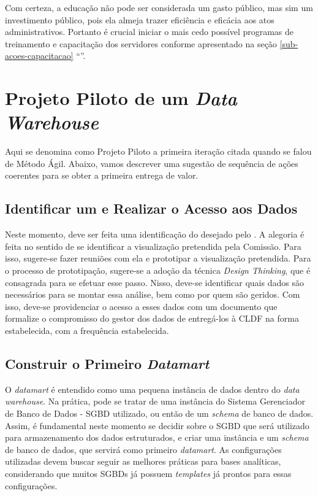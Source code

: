     Com certeza, a educação não pode ser considerada um gasto público, mas sim um investimento público, pois ela almeja trazer eficiência e eficácia aos atos administrativos. Portanto é crucial iniciar o mais cedo possível programas de treinamento e capacitação dos servidores conforme apresentado na seção \ref{sub-acoes-capacitacao} ``''. 

\section{Projeto Piloto de um \emph{Data Warehouse}}

Aqui se denomina como Projeto Piloto a primeira iteração citada quando se falou de Método Ágil. Abaixo, vamos descrever uma sugestão de sequência de ações coerentes para se obter a primeira entrega de valor.

\subsection{Identificar um \PRATO \xspace e Realizar o Acesso aos Dados}

Neste momento, deve ser feita uma identificação do \PRATO \xspace desejado pelo \CLIENTE. A alegoria é feita no sentido de se identificar a visualização pretendida pela Comissão. Para isso, sugere-se fazer reuniões com ela e prototipar a visualização pretendida. Para o processo de prototipação, sugere-se a adoção da técnica \emph{Design Thinking}, que é consagrada para se efetuar esse passo. Nisso, deve-se identificar quais dados são necessários para se montar essa análise, bem como por quem são geridos. Com isso, deve-se providenciar o acesso a esses dados com um documento que formalize o compromisso do gestor dos dados de entregá-los à CLDF na forma estabelecida, com a frequência estabelecida.

\subsection{Construir o Primeiro \emph{Datamart}}

O \emph{datamart} é entendido como uma pequena instância de dados dentro do \emph{data warehouse}. Na prática, pode se tratar de uma instância do Sistema Gerenciador de Banco de Dados - SGBD utilizado, ou então de um \emph{schema} de banco de dados. Assim, é fundamental neste momento se decidir sobre o SGBD que será utilizado para armazenamento dos dados estruturados, e criar uma instância e um \emph{schema} de banco de dados, que servirá como primeiro \emph{datamart}. As configurações utilizadas devem buscar seguir as melhores práticas para bases analíticas, considerando que muitos SGBDs já possuem \emph{templates} já prontos para essas configurações.

